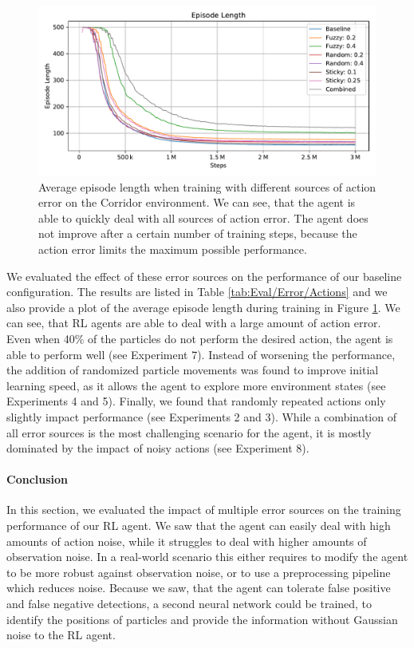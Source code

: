 \begin{figure}[htp]
    \begin{center}
        \includegraphics[clip, width=0.9\columnwidth]{figures/evaluation/error/action_error_ep_len.pdf}
    \end{center}
    \caption[Episode Length During Training with Action Error]{Average episode length when training with different sources of action error on the Corridor environment. We can see, that the agent is able to quickly deal with all sources of action error. The agent does not improve after a certain number of training steps, because the action error limits the maximum possible performance.} \label{fig:Eval/Error/ActionsTrain}
\end{figure}

We evaluated the effect of these error sources on the performance of our baseline configuration. The results are listed in Table \ref{tab:Eval/Error/Actions} and we also provide a plot of the average episode length during training in Figure \ref{fig:Eval/Error/ActionsTrain}. We can see, that RL agents are able to deal with a large amount of action error. Even when 40\% of the particles do not perform the desired action, the agent is able to perform well (see Experiment 7). Instead of worsening the performance, the addition of randomized particle movements was found to improve initial learning speed, as it allows the agent to explore more environment states (see Experiments 4 and 5). Finally, we found that randomly repeated actions only slightly impact performance (see Experiments 2 and 3). While a combination of all error sources is the most challenging scenario for the agent, it is mostly dominated by the impact of noisy actions (see Experiment 8).  

\paragraph{Conclusion}
In this section, we evaluated the impact of multiple error sources on the training performance of our RL agent. We saw that the agent can easily deal with high amounts of action noise, while it struggles to deal with higher amounts of observation noise. In a real-world scenario this either requires to modify the agent to be more robust against observation noise, or to use a preprocessing pipeline which reduces noise. Because we saw, that the agent can tolerate false positive and false negative detections, a second neural network could be trained, to identify the positions of particles and provide the information without Gaussian noise to the RL agent.


